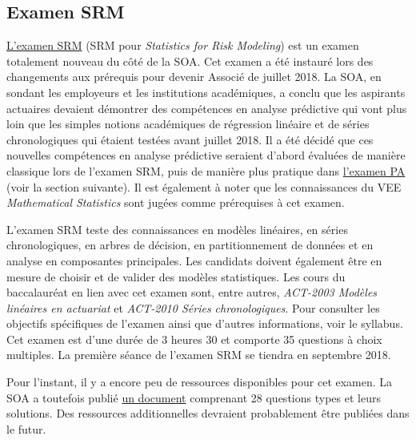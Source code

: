 \subsection*{Examen SRM}
\label{subsec:examsrm}

\href{https://www.soa.org/Education/Exam-Req/edu-exam-srm-detail.aspx}{L'examen SRM} (SRM pour \textit{Statistics for Risk Modeling}) est un examen totalement nouveau du côté de la SOA. Cet examen a été instauré lors des changements aux prérequis pour devenir Associé de juillet 2018. La SOA, en sondant les employeurs et les institutions académiques, a conclu que les aspirants actuaires devaient démontrer des compétences en analyse prédictive qui vont plus loin que les simples notions académiques de régression linéaire et de séries chronologiques qui étaient testées avant juillet 2018. Il a été décidé que ces nouvelles compétences en analyse prédictive seraient d'abord évaluées de manière classique lors de l'examen SRM, puis de manière plus pratique dans \href{https://www.soa.org/Education/Exam-Req/edu-exam-pa-detail.aspx}{l'examen PA} (voir la section suivante). Il est également à noter que les connaissances du VEE \textit{Mathematical Statistics} sont jugées comme prérequises à cet examen. \vspace{\baselineskip}

L'examen SRM teste des connaissances en modèles linéaires, en séries chronologiques, en arbres de décision, en partitionnement de données et en analyse en composantes principales. Les candidats doivent également être en mesure de choisir et de valider des modèles statistiques. Les cours du baccalauréat en lien avec cet examen sont, entre autres, \textit{ACT-2003 Modèles linéaires en actuariat} et \textit{ACT-2010 Séries chronologiques}. Pour consulter les objectifs spécifiques de l'examen ainsi que d'autres informations, voir le syllabus. Cet examen est d'une durée de 3 heures 30 et comporte 35 questions à choix multiples. La première séance de l'examen SRM se tiendra en septembre 2018. \vspace{\baselineskip}

Pour l'instant, il y a encore peu de ressources disponibles pour cet examen. La SOA a toutefois publié \href{https://www.soa.org/Files/Edu/2018/exam-srm-sample-questions.pdf}{un document} comprenant 28 questions types et leurs solutions. Des ressources additionnelles devraient probablement être publiées dans le futur. \vspace{\baselineskip} \newpage


